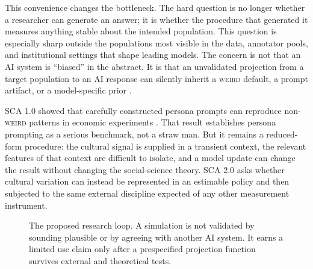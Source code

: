 \documentclass[10pt,letterpaper]{article}
\newcommand{\WEIRD}{\textsc{weird}}
\begin{document}
This convenience changes the bottleneck. The hard question is no longer whether a researcher can generate an answer; it is whether the procedure that generated it measures anything stable about the intended population. This question is especially sharp outside the populations most visible in the data, annotator pools, and institutional settings that shape leading models. The concern is not that an AI system is ``biased'' in the abstract. It is that an unvalidated projection from a target population to an AI response can silently inherit a \WEIRD{} default, a prompt artifact, or a model-specific prior \cite{henrich2010,durmus2024}.

SCA 1.0 showed that carefully constructed persona prompts can reproduce non-\WEIRD{} patterns in economic experiments \cite{capra2025}. That result establishes persona prompting as a serious benchmark, not a straw man. But it remains a reduced-form procedure: the cultural signal is supplied in a transient context, the relevant features of that context are difficult to isolate, and a model update can change the result without changing the social-science theory. SCA 2.0 asks whether cultural variation can instead be represented in an estimable policy and then subjected to the same external discipline expected of any other measurement instrument.

\begin{figure}[t]
\centering
{}
\caption{The proposed research loop. A simulation is not validated by sounding plausible or by agreeing with another AI system. It earns a limited use claim only after a prespecified projection function survives external and theoretical tests.}
\label{fig:loop}
\end{figure}
\end{document}
